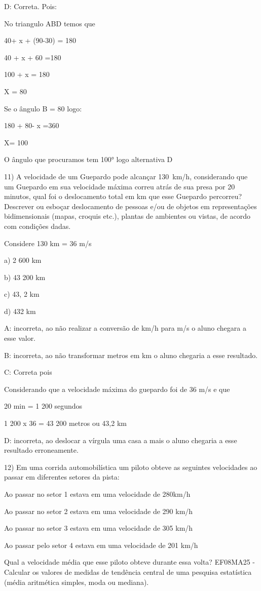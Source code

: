 {D: Correta. Pois:

No triangulo ABD temos que

40+ x + (90-30) = 180

40 + x + 60 =180

100 + x = 180

X = 80

Se o ângulo B = 80 logo:

180 + 80- x =360

X= 100

O ângulo que procuramos tem 100° logo alternativa D

11) A velocidade de um Guepardo pode alcançar 130~km/h, considerando que
um Guepardo em sua velocidade máxima correu atrás de sua presa por 20
minutos, qual foi o deslocamento total em km que esse Guepardo
percorreu? Descrever ou esboçar deslocamento de pessoas e/ou de objetos
em representações bidimensionais (mapas, croquis etc.), plantas de
ambientes ou vistas, de acordo com condições dadas.

Considere 130 km = 36 m/s

a) 2 600 km

b) 43 200 km

c) 43, 2 km

d) 432 km

A: incorreta, ao não realizar a conversão de km/h para m/s o aluno
chegara a esse valor.

B: incorreta, ao não transformar metros em km o aluno chegaria a esse
resultado.

C: Correta pois

Considerando que a velocidade máxima do guepardo foi de 36 m/s e que

20 min = 1 200 segundos

1 200 x 36 = 43 200 metros ou 43,2 km

D: incorreta, ao deslocar a vírgula uma casa a mais o aluno chegaria a
esse resultado erroneamente.

12) Em uma corrida automobilística um piloto obteve as seguintes
velocidades ao passar em diferentes setores da pista:

Ao passar no setor 1 estava em uma velocidade de 280km/h

Ao passar no setor 2 estava em uma velocidade de 290 km/h

Ao passar no setor 3 estava em uma velocidade de 305 km/h

Ao passar pelo setor 4 estava em uma velocidade de 201 km/h

Qual a velocidade média que esse piloto obteve durante essa volta?
EF08MA25 - Calcular os valores de medidas de tendência central de uma
pesquisa estatística (média aritmética simples, moda ou mediana).

}
